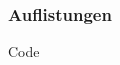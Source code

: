 \begin{frame}
    \frametitle{Auflistungen}
    \begin{block}{Code}
        \begin{columns}
            \begin{column}{0.59\textwidth}
                
            \end{column}
            \begin{column}{0.35\textwidth}
                \rule{0pt}{15pt}
                \\
                
            \end{column}
        \end{columns}
    \end{block}
\end{frame}
